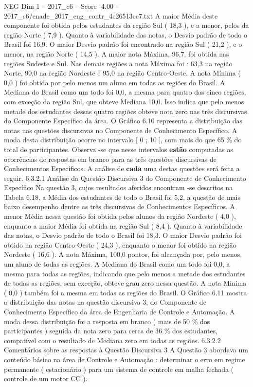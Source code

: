 \begin{textsample}{NEG Dim 1 – 2017\_c6 – Score -4.00 – 2017\_c6/enade\_2017\_eng\_contr\_4e26513cc7.txt}
A maior Média deste componente foi obtida pelos estudantes da região Sul ( 18,3 ), e a menor, pelos da região Norte ( 7,9 ).
Quanto à variabilidade das notas, o Desvio padrão de todo o Brasil foi 16,9.
O maior Desvio padrão foi encontrado na região Sul ( 21,2 ), e o menor, na região Norte ( 14,5 ).
A maior nota Máxima, 96,7, foi obtida nas regiões Sudeste e Sul.
Nas demais regiões a nota Máxima foi : 63,3 na região Norte, 90,0 na região Nordeste e 95,0 na região Centro-Oeste.
A nota Mínima ( 0,0 ) foi obtida por pelo menos um aluno em todas as regiões do Brasil.
A Mediana do Brasil como um todo foi 0,0, a mesma para quatro das cinco regiões, com exceção da região Sul, que obteve Mediana 10,0.
Isso indica que pelo menos metade dos estudantes dessas quatro regiões obteve nota zero nas três discursivas do Componente Específico da área.
O Gráfico 6.10 representa a distribuição das notas nas questões discursivas no Componente de Conhecimento Específico.
A moda desta distribuição ocorre no intervalo [ 0 ; 10 ], com mais do que 65 \% do total de participantes.
Observa -se que nesse intervalos \textbf{estão} computadas as ocorrências de respostas em branco para as três questões discursivas de Conhecimentos Específicos.
A análise de \textbf{cada} uma destas questões será feita a seguir. 6.3.2.1 Análise da Questão Discursiva 3 do Componente de Conhecimento Específico Na questão 3, cujos resultados aferidos encontram -se descritos na Tabela 6.18, a Média dos estudantes de todo o Brasil foi 5,2, a questão de mais baixo desempenho dentre as três discursivas de Conhecimentos Específicos.
A menor Média nessa questão foi obtida pelos alunos da região Nordeste ( 4,0 ), enquanto a maior Média foi obtida na região Sul ( 8,4 ).
Quanto à variabilidade das notas, o Desvio padrão de todo o Brasil foi 18,3.
O maior Desvio padrão foi obtido na região Centro-Oeste ( 24,3 ), enquanto o menor foi obtido na região Nordeste ( 16,6 ).
A nota Máxima, 100,0 pontos, foi alcançada por, pelo menos, um aluno de todas as regiões.
A Mediana do Brasil como um todo foi 0,0, a mesma para todas as regiões, indicando que pelo menos a metade dos estudantes de todas as regiões, sem exceção, obteve grau zero nessa questão.
A nota Mínima ( 0,0 ) também foi a mesma em todas as regiões do Brasil.
O Gráfico 6.11 mostra a distribuição das notas na questão discursiva 3, do Componente de Conhecimento Específico da área de Engenharia de Controle e Automação.
A moda dessa distribuição foi a resposta em branco ( mais de 50 \% dos participantes ) seguida da nota zero para cerca de 36 \% dos estudantes, compatível com o resultado de Mediana zero em todas as regiões. 6.3.2.2 Comentários sobre as respostas à Questão Discursiva 3 A Questão 3 abordava um conteúdo básico na área de Controle e Automação : determinar o erro em regime permanente ( estacionário ) para um sistema de controle em malha fechada ( controle de um motor CC ).

\end{textsample}
